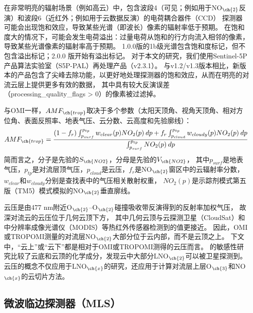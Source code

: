 在非常明亮的辐射场景（例如高云）中，包含波段4（可见；例如用于NO$_{\ch{2}}$反演）和波段6（近红外；例如用于云数据反演）的电荷耦合器件（CCD） 探测器可能会出现饱和效应\citep{Ludewig.2020}，导致某些光谱（即波长）像素的辐射率低于预期。
在饱和度大的情况下，可能会发生电荷溢出：过量电荷从饱和的行方向流入相邻的像素，导致某些光谱像素的辐射率高于预期。
1.0.0版的1b级光谱包含饱和度标记，但不包含溢出标记；2.0.0 版开始有溢出标记\citep{Ludewig.2020}。
对于本文的研究，我们使用Sentinel-5P产品算法实验室（S5P-PAL）再处理产品（v2.3.1）。
与v1.2/v1.3版本相比，新版本的产品包含了尖峰去除功能，以更好地处理探测器的饱和效应，从而在明亮的对流云层上提供更多有效的数据\citep{Ludewig.2020,VanGeffen.2022}，
其中具有较大反演误差（processing\_quality\_flags > 0）的像素被过滤掉。

与OMI一样，$AMF_{\ch{trop}}$取决于多个参数（太阳天顶角、视角天顶角、相对方位角、表面反照率、地表气压、云分数、云高度和先验廓线）：
\begin{equation} \label{eq:AMF_NO2}
AMF_{\ch{trop}} = \frac{(1-f_r) \int_{p_{surf}}^{p_{tp}} w_{clear}(p) NO_2(p) \: dp + f_r \int_{p_{cloud}}^{p_{tp}} w_{cloudy}(p) NO_2(p) \: dp}{\int_{p_{surf}}^{p_{tp}} NO_2(p) \: dp}
\end{equation}
简而言之，分子是先验的$S_{\ch{NO2}}$，分母是先验的$V_{\ch{NO2}}$，
其中$p_{surf}$是地表气压，$p_{tp}$是对流层顶气压，$p_{cloud}$是云压，$f_{r}$是NO$_{\ch{2}}$窗区中的云辐射率分数，
$w_{clear}$和$w_{cloudy}$分别是查找表中的气压相关散射权重\citep{Lorente.2017}，
$NO_2(p)$是示踪剂模式第五版（TM5）模式模拟的NO$_{\ch{2}}$垂直廓线。

云压是由477 nm附近O$_{\ch{2}}$--O$_{\ch{2}}$碰撞吸收带反演得到的反射率加权气压\citep{Acarreta.2004,Sneep.2008,Stammes.2008}，
故深对流云的云压位于几何云顶下方，
其中几何云顶与云探测卫星（CloudSat）和中分辨率成像光谱仪（MODIS）等热红外传感器检测到的值更接近\citep{Vasilkov.2008,Joiner.2012}。
因此，OMI或TROPOMI测量的对流层NO$_{\ch{2}}$大部分位于云内部，而不是云顶之上。
下文中，“云上”或“云下”都是相对于OMI或TROPOMI测得的云压而言。
\citet{Beirle.2009}的敏感性研究比较了云底和云顶的化学成分，发现云中大部分LNO$_{\ch{2}}$可以被卫星探测到。
云压的概念不仅应用于LNO$_{\ch{x}}$的研究，还应用于计算对流层上层O$_{\ch{3}}$和NO$_{\ch{x}}$的云切片方法\citep{Ziemke.2009,Choi.2014,Strode.2017,Ziemke.2017,Marais.2018}。


\subsection{微波临边探测器（MLS）}

